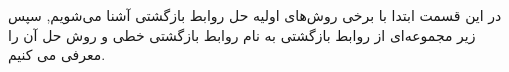 \p
در این قسمت ابتدا با برخی روش‌های اولیه حل روابط بازگشتی آشنا می‌شویم, سپس زیر مجموعه‌ای از روابط بازگشتی به نام روابط بازگشتی خطی و روش حل آن را معرفی می کنیم.




